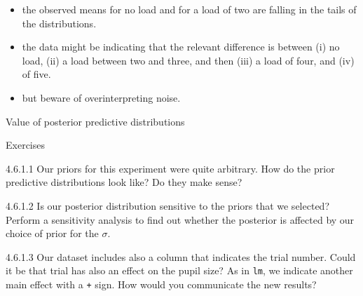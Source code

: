 \documentclass[12pt,ignorenonframetext,aspectratio=169]{beamer}
\providecommand{\tightlist}{%
  \setlength{\itemsep}{0pt}\setlength{\parskip}{0pt}}
\begin{document}
\begin{frame}

\begin{itemize}
\tightlist
\item
  the observed means for no load and for a load of two are falling in the tails of the distributions.
\item
  the data might be indicating that the relevant difference is between (i) no load, (ii) a load between two and three, and then (iii) a load of four, and (iv) of five.
\item
  but beware of overinterpreting noise.
\end{itemize}

\end{frame}

\begin{frame}{Value of posterior predictive distributions}
\protect\hypertarget{value-of-posterior-predictive-distributions}{}


\end{frame}

\begin{frame}[fragile]

\begin{block}{\color{blue} Exercises}

4.6.1.1 Our priors for this experiment were quite arbitrary. How do the prior predictive distributions look like? Do they make sense?

4.6.1.2 Is our posterior distribution sensitive to the priors that we selected? Perform a sensitivity analysis to find out whether the posterior is affected by our choice of prior for the \(\sigma\).

4.6.1.3 Our dataset includes also a column that indicates the trial number. Could it be that trial has also an effect on the pupil size? As in \texttt{lm}, we indicate another main effect with a \texttt{+} sign. How would you communicate the new results?

\end{block}

\end{frame}
\end{document}
